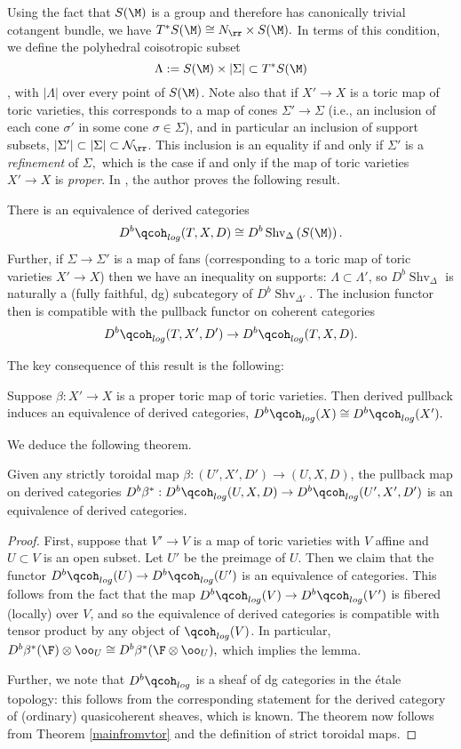 \documentclass{article}
\newcommand{\shv}{\operatorname{Shv}}
\newcommand{\N}{\mathcal{N}}
\begin{document}
Using the fact that $S(\M)$ is a group and therefore has canonically trivial cotangent bundle, we have $T^*S(\M) \cong N_\rr\times S(\M).$ In terms of this condition, we define the polyhedral coisotropic subset $$\Lambda : = S(\M)\times |\Sigma| \subset T^*S(\M)$$, with $|\Lambda|$ over every point of $S(\M)$. Note also that if $X'\to X$ is a toric map of toric varieties, this corresponds to a map of cones $\Sigma'\to \Sigma$ (i.e., an inclusion of each cone $\sigma'$ in some cone $\sigma\in \Sigma$), and in particular an inclusion of support subsets, $|\Sigma'|\subset |\Sigma|\subset \N_\rr$. This inclusion is an equality if and only if $\Sigma'$ is a \emph{refinement} of $\Sigma,$ which is the case if and only if the map of toric varieties $X'\to X$ is \emph{proper}.
In \cite{vtor}, the author proves the following result. 
\begin{thm}\label{mainfromvtor}
There is an equivalence of derived categories $$D^b\qcoh_{log}(T, X, D)\cong D^b\shv_{\Delta}\left(S(\M)\right).$$ Further, if $\Sigma\to \Sigma'$ is a map of fans (corresponding to a toric map of toric varieties $X'\to X$) then we have an inequality on supports: $\Lambda\subset \Lambda'$, so $D^b\shv_{\Delta}$ is naturally a (fully faithful, dg) subcategory of $D^b\shv_{\Delta'}$. The inclusion functor then is compatible with the pullback functor on coherent categories $$D^b\qcoh_{log}(T, X', D')\to D^b\qcoh_{log}(T, X, D).$$
\end{thm}
The key consequence of this result is the following:
\begin{cor}
  Suppose $\beta:X'\to X$ is a proper toric map of toric varieties. Then derived pullback induces an equivalence of derived categories, $D^b\qcoh_{log}(X)\cong D^b\qcoh_{log}(X').$ 
\end{cor}
We deduce the following theorem. 
\begin{thm}\label{toroidal-inv}
  Given any strictly toroidal map $\beta:(U', X', D')\to (U, X, D)$, the pullback map on derived categories $D^b\beta^*:D^b\qcoh_{log}(U, X, D)\to D^b\qcoh_{log}(U', X', D')$ is an equivalence of derived categories. 
\end{thm}
\begin{proof}
First, suppose that $V'\to V$ is a map of toric varieties with $V$ affine and $U\subset V$ is an open subset. Let $U'$ be the preimage of $U$. Then we claim that the functor $D^b\qcoh_{log}(U)\to D^b\qcoh_{log}(U')$ is an equivalence of categories. This follows from the fact that the map $D^b\qcoh_{log}(V)\to D^b\qcoh_{log}(V')$ is fibered (locally) over $V$, and so the equivalence of derived categories is compatible with tensor product by any object of $\qcoh_{log}(V)$. In particular, $D^b\beta^*(\F)\otimes \oo_U\cong D^b\beta^*(\F\otimes \oo_U),$ which implies the lemma. 

Further, we note that $D^b\qcoh_{log}$ is a sheaf of dg categories in the \'etale topology: this follows from the corresponding statement for the derived category of (ordinary) quasicoherent sheaves, which is known. The theorem now follows from Theorem \ref{mainfromvtor} and the definition of strict toroidal maps.
\end{proof}
\end{document}
